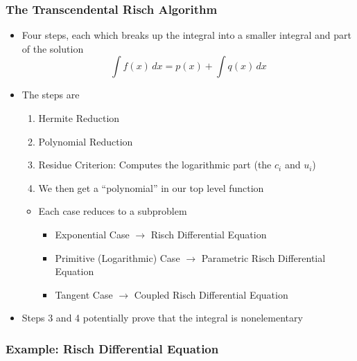 \documentclass{beamer}
\numberwithin{equation}{section} %
\begin{document}
\begin{frame}
    \frametitle{The Transcendental Risch Algorithm}
    \begin{itemize}
        \item Four steps, each which breaks up the integral into a
        smaller integral and part of the solution
        \begin{equation}
        \label{smaller integral}
        \int{f(x)\,dx} = p(x) + \int{q(x)\,dx}
        \end{equation}
        \pause
        \item The steps are 
            \begin{enumerate}
                \item Hermite Reduction
                \item Polynomial Reduction
                \item Residue Criterion: Computes the logarithmic part
                (the $c_i$ and $u_i$)
                \item We then get a ``polynomial'' in our top level
                function
            \end{enumerate}
            \pause
            \begin{itemize}
                \item Each case reduces to a subproblem
                    \begin{itemize}
                        \item Exponential Case $\longrightarrow$ Risch
                        Differential Equation
                        \item Primitive (Logarithmic) Case
                        $\longrightarrow$ Parametric Risch Differential
                        Equation
                        \item Tangent Case $\longrightarrow$ Coupled
                        Risch Differential Equation
                    \end{itemize}
            \end{itemize}
    \pause
    \item Steps 3 and 4 potentially prove that the integral is nonelementary
    \end{itemize}
\end{frame}

\subsubsection{Example: Risch Differential Equation}
\end{document}
